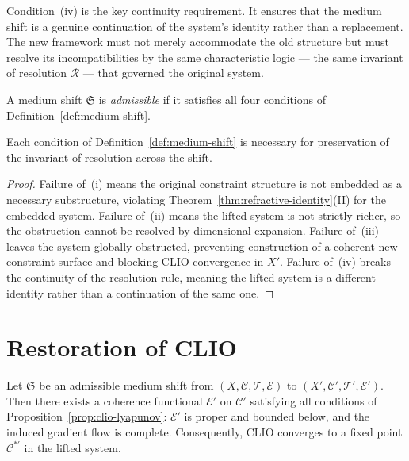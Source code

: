 \documentclass[11pt,openany]{book}
\begin{document}
Condition~(iv) is the key continuity requirement.  It
ensures that the medium shift is a genuine continuation
of the system's identity rather than a replacement.  The
new framework must not merely accommodate the old structure
but must resolve its incompatibilities by the same
characteristic logic — the same invariant of resolution
$\mathcal{R}$ — that governed the original system.

\begin{definition}
\label{def:admissible-shift}
A medium shift $\mathfrak{S}$ is \emph{admissible} if it
satisfies all four conditions of
Definition~\ref{def:medium-shift}.
\end{definition}

\begin{proposition}
\label{prop:necessity}
Each condition of Definition~\ref{def:medium-shift} is
necessary for preservation of the invariant of resolution
across the shift.
\end{proposition}

\begin{proof}
Failure of~(i) means the original constraint structure is
not embedded as a necessary substructure, violating
Theorem~\ref{thm:refractive-identity}(II) for the embedded
system.  Failure of~(ii) means the lifted system is not
strictly richer, so the obstruction cannot be resolved by
dimensional expansion.  Failure of~(iii) leaves the system
globally obstructed, preventing construction of a coherent
new constraint surface and blocking CLIO convergence in
$X'$.  Failure of~(iv) breaks the continuity of the
resolution rule, meaning the lifted system is a different
identity rather than a continuation of the same one.
\end{proof}

\section{Restoration of CLIO}
\label{sec:clio-restoration}

\begin{theorem}
\label{thm:clio-restoration}
Let $\mathfrak{S}$ be an admissible medium shift from
$(X, \mathcal{C}, \mathcal{T}, \mathcal{E})$ to
$(X', \mathcal{C}', \mathcal{T}', \mathcal{E}')$.  Then
there exists a coherence functional $\mathcal{E}'$ on
$\mathcal{C}'$ satisfying all conditions of
Proposition~\ref{prop:clio-lyapunov}: $\mathcal{E}'$ is
proper and bounded below, and the induced gradient flow is
complete.  Consequently, CLIO converges to a fixed point
$\mathcal{C}^{*\prime}$ in the lifted system.
\end{theorem}
\end{document}
